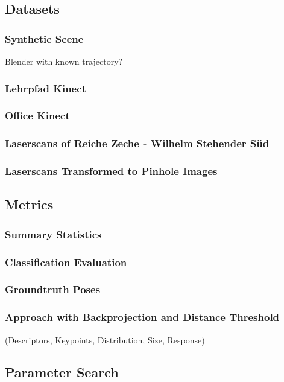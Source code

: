 \subsection{Datasets}
\subsubsection{Synthetic Scene}
Blender with known trajectory?
\subsubsection{Lehrpfad Kinect}
\subsubsection{Office Kinect}
\subsubsection{Laserscans of Reiche Zeche - Wilhelm Stehender Süd}
\subsubsection{Laserscans Transformed to Pinhole Images}

\subsection{Metrics}

\subsubsection{Summary Statistics}
\subsubsection{Classification Evaluation}
\subsubsection{Groundtruth Poses}
\subsubsection{Approach with Backprojection and Distance Threshold}

(Descriptors, Keypoints, Distribution, Size, Response)

\subsection{Parameter Search}
